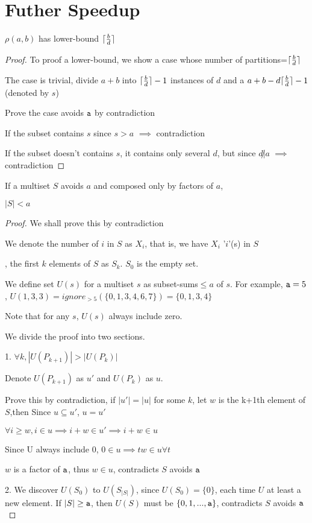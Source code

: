 \section{Futher Speedup}

\begin{lemma}
$\rho(a,b)$ has lower-bound $\lceil\frac{b}{d}\rceil$
\end{lemma} 

\begin{proof}
To proof a lower-bound, we show a case whose number of partitions=$\lceil\frac{b}{d}\rceil$

The case is trivial, divide $a+b$ into $\lceil\frac{b}{d}\rceil-1$ instances of $d$ and a $a+b-d\lceil\frac{b}{d}\rceil-1$ (denoted by $s$)

Prove the case avoids $\mathtt{a}$ by contradiction

If the subset contains $s$ since $s>a$ $\implies$ contradiction

If the subset doesn't contains $s$, it contains only several $d$, but since $d\not| a$ $\implies$ contradiction
\end{proof}

\begin{lemma}
If a multiset $S$ avoids $a$ and composed only by factors of $a$, 

$|S|<a$
\end{lemma}

\begin{proof}

We shall prove this by contradiction

We denote the number of $i$ in $S$ as $X_i$, that is, we have $X_i$ '$i$'(s) in $S$

, the first $k$ elements of $S$ as $S_k$. $S_0$ is the empty set.

We define set $U(s)$ for a multiset $s$ as subset-sums$\leq a$ of $s$. For example, $\mathtt{a}=5$, $U({1,3,3})=ignore_{>5}(\{ 0,1,3,4,6,7\})=\{ 0,1,3,4\}$

Note that for any $s$, $U(s)$ always include zero.

We divide the proof into two sections.

1. $\forall k, |U(P_{k+1})|>|U(P_k)| $ 

Denote $U(P_{k+1})$ as $u'$ and $U(P_k)$ as $u$.

Prove this by contradiction, if $|u'|=|u|$ for some $k$, let $w$ is the k+1th element of $S$,then 
Since $u\subseteq u'$, $u=u'$

$\forall i\geq w, i \in u \implies i+w\in u' \implies i+w\in u$

Since U always include 0, $0\in u \implies tw\in u \forall t$

$w$ is a factor of $\mathtt{a}$, thus $w\in u$, contradicts $S$ avoids $\mathtt{a}$

2. We discover $U(S_0)$ to $U(S_{|S|})$, since $U(S_0)=\{0\}$, each time
$U$ at least a new element. If $|S|\geq \mathtt{a}$, then $U(S)$
must be $\{0,1,...,\mathtt{a}\}$, contradicts $S$ avoids $\mathtt{a}$


\end{proof}

